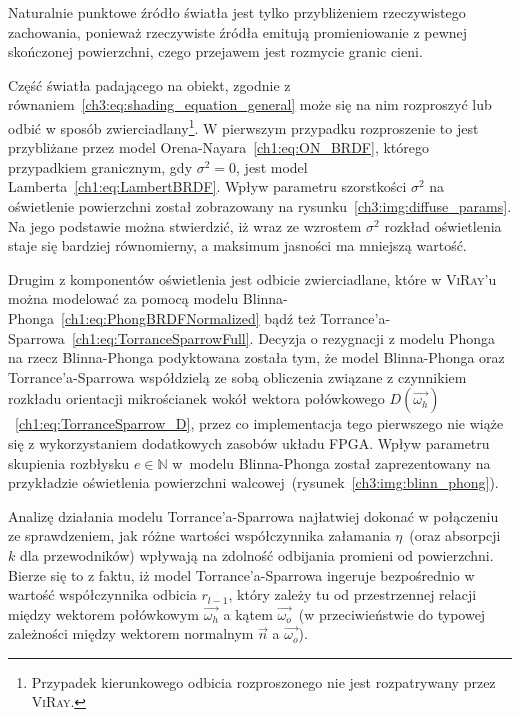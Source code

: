 \begin{enumerate}
Naturalnie punktowe źródło światła jest tylko przybliżeniem rzeczywistego zachowania, ponieważ rzeczywiste źródła emitują promieniowanie z pewnej skończonej powierzchni, czego przejawem jest rozmycie granic cieni. 



Część światła padającego na obiekt, zgodnie z równaniem~\eqref{ch3:eq:shading_equation_general} może się na nim rozproszyć lub odbić w sposób zwierciadlany\footnote{Przypadek kierunkowego odbicia rozproszonego nie jest rozpatrywany przez \textsc{ViRay}.}. W pierwszym przypadku rozproszenie to jest przybliżane przez model Orena-Nayara~\eqref{ch1:eq:ON_BRDF}, którego przypadkiem granicznym, gdy $\sigma^2 = 0$, jest model Lamberta~\eqref{ch1:eq:LambertBRDF}. Wpływ parametru szorstkości $\sigma^2$ na oświetlenie powierzchni został zobrazowany na rysunku~\ref{ch3:img:diffuse_params}. Na jego podstawie można stwierdzić, iż wraz ze wzrostem $\sigma^2$ rozkład oświetlenia staje się bardziej równomierny, a maksimum jasności ma mniejszą wartość. 



Drugim z komponentów oświetlenia jest odbicie zwierciadlane, które w \textsc{ViRay}'u można modelować za pomocą modelu Blinna-Phonga~\eqref{ch1:eq:PhongBRDFNormalized} bądź też Torrance'a-Sparrowa~\eqref{ch1:eq:TorranceSparrowFull}. Decyzja o rezygnacji z modelu Phonga na rzecz Blinna-Phonga podyktowana została tym, że model Blinna-Phonga oraz Torrance'a-Sparrowa współdzielą ze sobą obliczenia związane z czynnikiem rozkładu orientacji mikrościanek wokół wektora połówkowego $D(\vec{\omega_h})$~\eqref{ch1:eq:TorranceSparrow_D}, przez co implementacja tego pierwszego nie wiąże się z wykorzystaniem dodatkowych zasobów układu FPGA. Wpływ parametru skupienia rozbłysku $e \in \mathbb{N}$ w~modelu Blinna-Phonga został zaprezentowany na przykładzie oświetlenia powierzchni walcowej~(rysunek~\ref{ch3:img:blinn_phong}).


Analizę działania modelu Torrance'a-Sparrowa najłatwiej dokonać w połączeniu ze sprawdzeniem, jak różne wartości współczynnika załamania $\eta$~(oraz absorpcji $k$ dla przewodników) wpływają na zdolność odbijania promieni od powierzchni. Bierze się to z faktu, iż model Torrance'a-Sparrowa ingeruje bezpośrednio w wartość współczynnika odbicia $r_{l-1}$, który zależy tu od przestrzennej relacji między wektorem połówkowym $\vec{\omega_h}$ a kątem $\vec{\omega_o}$~(w przeciwieństwie do typowej zależności między wektorem normalnym $\vec{n}$ a $\vec{\omega_o}$).


\end{enumerate}

